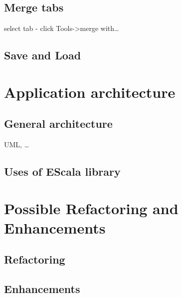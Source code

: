 \documentclass[12pt, accentcolor=tud9c, linedtoc, bigchapter, colorback, noresetcounter, numbersubsubsec]{tudreport}
\begin{document}
\section{Merge tabs}

select tab - click Tools->merge with\dots

\section{Save and Load}

\chapter{Application architecture}

\section{General architecture}
UML, \dots

\section{Uses of EScala library}

\chapter{Possible Refactoring and Enhancements}

\section{Refactoring}

\section{Enhancements}
\end{document}
